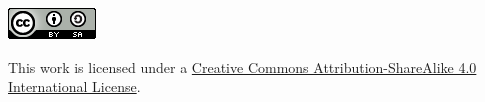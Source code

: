 \clearpage
\begin{center}
    \includegraphics{images/cc.png}
    
    This work is licensed under a \linebreak
    \href{https://creativecommons.org/licenses/by-sa/4.0/}{Creative Commons Attribution-ShareAlike 4.0 International License}.
\end{center}